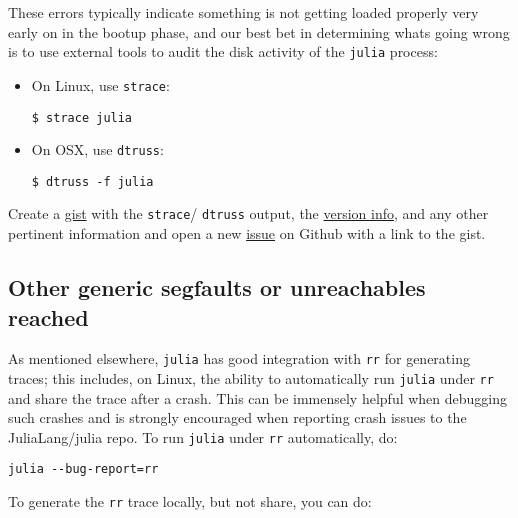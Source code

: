 These errors typically indicate something is not getting loaded properly very early on in the bootup phase, and our best bet in determining what{\textquotesingle}s going wrong is to use external tools to audit the disk activity of the \texttt{julia} process:



\begin{itemize}
\item On Linux, use \texttt{strace}:


\begin{lstlisting}
$ strace julia
\end{lstlisting}


\item On OSX, use \texttt{dtruss}:


\begin{lstlisting}
$ dtruss -f julia
\end{lstlisting}

\end{itemize}


Create a \href{https://gist.github.com}{gist} with the \texttt{strace}/ \texttt{dtruss} output, the \hyperlink{4601189142062189569}{version info}, and any other pertinent information and open a new \href{https://github.com/JuliaLang/julia/issues?q=is\%3Aopen}{issue} on Github with a link to the gist.



\hypertarget{15486738137712275027}{}


\subsection{Other generic segfaults or unreachables reached}



As mentioned elsewhere, \texttt{julia} has good integration with \texttt{rr} for generating traces; this includes, on Linux, the ability to automatically run \texttt{julia} under \texttt{rr} and share the trace after a crash. This can be immensely helpful when debugging such crashes and is strongly encouraged when reporting crash issues to the JuliaLang/julia repo. To run \texttt{julia} under \texttt{rr} automatically, do:




\begin{verbatim}
julia --bug-report=rr
\end{verbatim}



To generate the \texttt{rr} trace locally, but not share, you can do:




